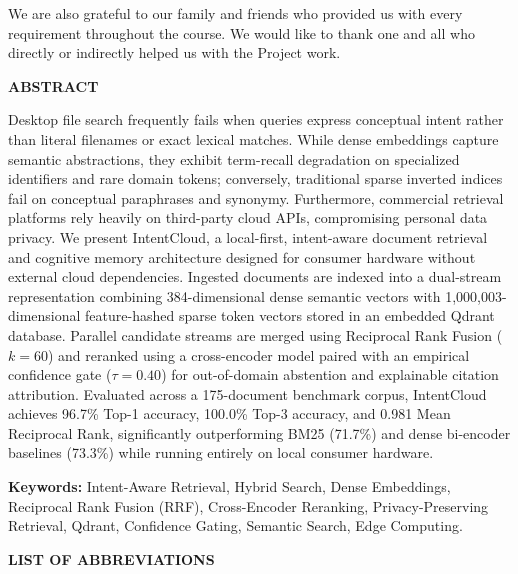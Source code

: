 \documentclass[a4paper,12pt]{article}
\begin{document}
We are also grateful to our family and friends who provided us with every requirement throughout the course. We would like to thank one and all who directly or indirectly helped us with the Project work.
\clearpage

\begin{center}
    \textbf{\Large ABSTRACT}
\end{center}

Desktop file search frequently fails when queries express conceptual intent rather than literal filenames or exact lexical matches. While dense embeddings capture semantic abstractions, they exhibit term-recall degradation on specialized identifiers and rare domain tokens; conversely, traditional sparse inverted indices fail on conceptual paraphrases and synonymy. Furthermore, commercial retrieval platforms rely heavily on third-party cloud APIs, compromising personal data privacy. We present IntentCloud, a local-first, intent-aware document retrieval and cognitive memory architecture designed for consumer hardware without external cloud dependencies. Ingested documents are indexed into a dual-stream representation combining 384-dimensional dense semantic vectors with 1,000,003-dimensional feature-hashed sparse token vectors stored in an embedded Qdrant database. Parallel candidate streams are merged using Reciprocal Rank Fusion ($k = 60$) and reranked using a cross-encoder model paired with an empirical confidence gate ($\tau = 0.40$) for out-of-domain abstention and explainable citation attribution. Evaluated across a 175-document benchmark corpus, IntentCloud achieves 96.7\% Top-1 accuracy, 100.0\% Top-3 accuracy, and 0.981 Mean Reciprocal Rank, significantly outperforming BM25 (71.7\%) and dense bi-encoder baselines (73.3\%) while running entirely on local consumer hardware.

\vspace{25pt}

\textbf{Keywords:} Intent-Aware Retrieval, Hybrid Search, Dense Embeddings, Reciprocal Rank Fusion (RRF), Cross-Encoder Reranking, Privacy-Preserving Retrieval, Qdrant, Confidence Gating, Semantic Search, Edge Computing.
\clearpage

\begin{center}
    \textbf{\Large LIST OF ABBREVIATIONS}
\end{center}
\vspace{0.5cm}
\end{document}
